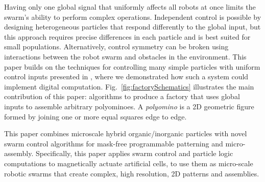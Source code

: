 Having only one global signal that uniformly affects all robots at once
limits the swarm's ability to perform complex operations.
Independent control is possible by designing heterogeneous particles that respond differently to the global input, but this approach requires precise differences in each particle and is best suited for small populations. 
Alternatively, control symmetry can be broken using interactions between the robot swarm and obstacles in the environment. 
This paper builds on the techniques for controlling many simple particles with uniform control inputs presented in \cite{Becker2013f,Becker2014,Becker2014a}, where
we demonstrated how such a system could  implement digital computation.
Fig.~\ref{fig:factorySchematics} illustrates the main contribution of this paper: algorithms to produce a factory that uses global inputs to assemble arbitrary polyominoes.
A \emph{polyomino} is a 2D geometric figure formed by joining one or more equal squares edge to edge.

This paper combines microscale hybrid organic/inorganic particles with novel swarm control algorithms for mask-free programmable patterning and micro-assembly. 
Specifically, this paper applies swarm control and particle logic computations to magnetically actuate artificial cells, to use them as micro-scale robotic swarms that create complex, high resolution, 2D patterns and assemblies.

